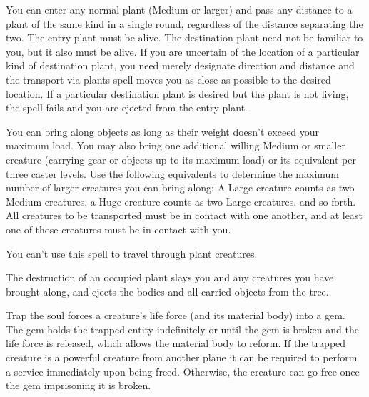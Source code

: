 \begin{multicols}{2}
\begin{small}
\noindent You can enter any normal plant (Medium or larger) and pass any distance to a plant of the same kind in a single round, regardless of the distance separating the two. The entry plant must be alive. The destination plant need not be familiar to you, but it also must be alive. If you are uncertain of the location of a particular kind of destination plant, you need merely designate direction and distance and the transport via plants spell moves you as close as possible to the desired location. If a particular destination plant is desired but the plant is not living, the spell fails and you are ejected from the entry plant.

\smallskip\noindent You can bring along objects as long as their weight doesn't exceed your maximum load. You may also bring one additional willing Medium or smaller creature (carrying gear or objects up to its maximum load) or its equivalent per three caster levels. Use the following equivalents to determine the maximum number of larger creatures you can bring along: A Large creature counts as two Medium creatures, a Huge creature counts as two Large creatures, and so forth. All creatures to be transported must be in contact with one another, and at least one of those creatures must be in contact with you.

\smallskip\noindent You can't use this spell to travel through plant creatures.

\smallskip\noindent The destruction of an occupied plant slays you and any creatures you have brought along, and ejects the bodies and all carried objects from the tree.

\noindent Trap the soul forces a creature's life force (and its material body) into a gem. The gem holds the trapped entity indefinitely or until the gem is broken and the life force is released, which allows the material body to reform. If the trapped creature is a powerful creature from another plane it can be required to perform a service immediately upon being freed. Otherwise, the creature can go free once the gem imprisoning it is broken.


\end{small}
\end{multicols}
